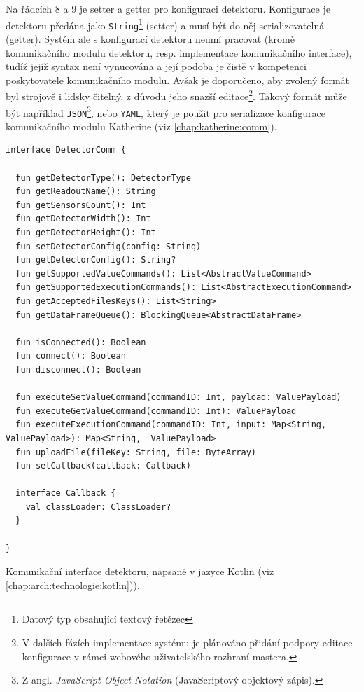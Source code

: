 Na řádcích 8 a 9 je setter a getter pro konfiguraci detektoru. Konfigurace je detektoru předána jako \texttt{String}\footnote{Datový typ obsahující textový řetězec} (setter) a musí být do něj serializovatelná (getter). Systém ale s konfigurací detektoru neumí pracovat (kromě komunikačního modulu detektoru, resp. implementace komunikačního interface), tudíž jejíž syntax není vynucována a její podoba je čistě v kompetenci poskytovatele komunikačního modulu. Avšak je doporučeno, aby zvolený formát byl strojově i lidsky čitelný, z důvodu jeho snazší editace\footnote{V dalších fázích implementace systému je plánováno přidání podpory editace konfigurace v rámci webového uživatelského rozhraní mastera.}. Takový formát může být například \texttt{JSON}\footnote{Z angl. \textit{JavaScript Object Notation} (JavaScriptový objektový zápis).}, nebo \texttt{YAML}, který je použit pro serializace konfigurace komunikačního modulu Katherine (viz \ref{chap:katherine:comm}).

\begin{code}[h!]
\begin{verbatim}
interface DetectorComm {

  fun getDetectorType(): DetectorType
  fun getReadoutName(): String
  fun getSensorsCount(): Int
  fun getDetectorWidth(): Int
  fun getDetectorHeight(): Int
  fun setDetectorConfig(config: String)
  fun getDetectorConfig(): String?
  fun getSupportedValueCommands(): List<AbstractValueCommand>
  fun getSupportedExecutionCommands(): List<AbstractExecutionCommand>
  fun getAcceptedFilesKeys(): List<String>
  fun getDataFrameQueue(): BlockingQueue<AbstractDataFrame>
  
  fun isConnected(): Boolean
  fun connect(): Boolean
  fun disconnect(): Boolean
  
  fun executeSetValueCommand(commandID: Int, payload: ValuePayload)
  fun executeGetValueCommand(commandID: Int): ValuePayload
  fun executeExecutionCommand(commandID: Int, input: Map<String, ValuePayload>): Map<String,  ValuePayload>
  fun uploadFile(fileKey: String, file: ByteArray)
  fun setCallback(callback: Callback)
  
  interface Callback {
    val classLoader: ClassLoader?
  }

}
\end{verbatim}
\caption{Komunikační interface detektoru, napsané v jazyce Kotlin (viz \ref{chap:arch:technologie:kotlin})).}
\label{src:handler:comm_intf}
\end{code}

